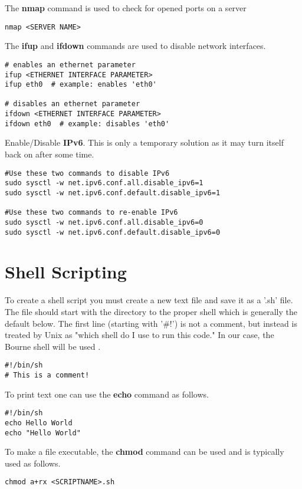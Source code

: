 The \textbf{nmap} command is used to check for opened ports on a server
\begin{lstlisting}
nmap <SERVER NAME>
\end{lstlisting}

The \textbf{ifup} and \textbf{ifdown} commands are used to disable network interfaces.
\begin{lstlisting}
# enables an ethernet parameter
ifup <ETHERNET INTERFACE PARAMETER>
ifup eth0  # example: enables 'eth0'

# disables an ethernet parameter
ifdown <ETHERNET INTERFACE PARAMETER>
ifdown eth0  # example: disables 'eth0'
\end{lstlisting}

Enable/Disable \textbf{IPv6}. This is only a temporary solution as it may turn itself back on after some time.
\begin{lstlisting}
#Use these two commands to disable IPv6
sudo sysctl -w net.ipv6.conf.all.disable_ipv6=1
sudo sysctl -w net.ipv6.conf.default.disable_ipv6=1

#Use these two commands to re-enable IPv6
sudo sysctl -w net.ipv6.conf.all.disable_ipv6=0
sudo sysctl -w net.ipv6.conf.default.disable_ipv6=0
\end{lstlisting}






\section{Shell Scripting}

To create a shell script you must create a new text file and save it as a '.sh' file. The file should start with the directory to the proper shell which is generally the default below. The first line (starting with '\#!') is not a comment, but instead is treated by Unix as "which shell do I use to run this code." In our case, the Bourne shell will be used \cite{linux: shell scripting}.
\begin{lstlisting}
#!/bin/sh
# This is a comment!
\end{lstlisting}

To print text one can use the \textbf{echo} command as follows.
\begin{lstlisting}
#!/bin/sh
echo Hello World
echo "Hello World"
\end{lstlisting}

To make a file executable, the \textbf{chmod} command can be used and is typically used as follows.
\begin{lstlisting}
chmod a+rx <SCRIPTNAME>.sh
\end{lstlisting}

